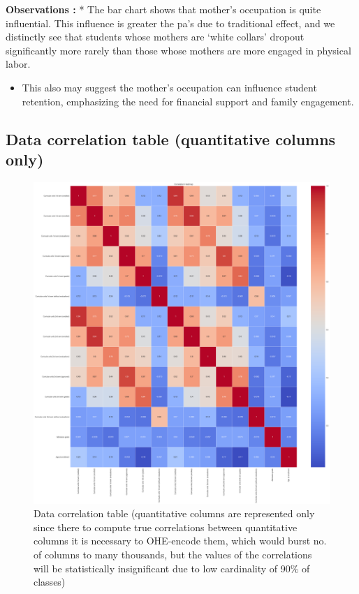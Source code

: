 \documentclass[
  letterpaper,
  DIV=11,
  numbers=noendperiod]{scrartcl}
\providecommand{\tightlist}{%
  \setlength{\itemsep}{0pt}\setlength{\parskip}{0pt}}\usepackage{longtable,booktabs,array}
\begin{document}
\textbf{Observations :} * The bar chart shows that mother's occupation
is quite influential. This influence is greater the pa's due to
traditional effect, and we distinctly see that students whose mothers
are \enquote*{white collars} dropout significantly more rarely than
those whose mothers are more engaged in physical labor.

\begin{itemize}
\tightlist
\item
  This also may suggest the mother's occupation can influence student
  retention, emphasizing the need for financial support and family
  engagement.
\end{itemize}

\hypertarget{data-correlation-table-quantitative-columns-only}{%
\subsection{Data correlation table (quantitative columns
only)}\label{data-correlation-table-quantitative-columns-only}}

\begin{figure}

{\centering \includegraphics{report_AzadhdhinNedalYunisAlFraijat_files/figure-pdf/fig-correlation-output-1.png}

}

\caption{\label{fig-correlation}Data correlation table (quantitative
columns are represented only since there to compute true correlations
between quantitative columns it is necessary to OHE-encode them, which
would burst no. of columns to many thousands, but the values of the
correlations will be statistically insignificant due to low cardinality
of 90\% of classes)}

\end{figure}
\end{document}
